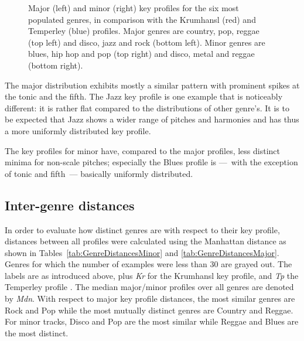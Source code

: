 \documentclass{article}
\begin{document}
\begin{figure}[tb]
	\caption{Major (left) and minor (right) key profiles for the six most populated genres, in comparison with the Krumhansl (red) and Temperley (blue) profiles. Major genres are country, pop, reggae (top left) and disco, jazz and rock (bottom left). Minor genres are blues, hip hop and pop (top right) and disco, metal and reggae (bottom right).}
	\label{fig:SpecificKeyProfiles}
\end{figure}
The major distribution exhibits mostly a similar pattern with prominent spikes at the tonic and the fifth. The Jazz key profile is one example that is noticeably different: it is rather flat compared to the distributions of other genre's. It is to be expected that Jazz shows a wider range of pitches and harmonies and has thus a more uniformly distributed key profile.

The key profiles for minor have, compared to the major profiles, less distinct minima for non-scale pitches; especially the Blues profile is ---~with the exception of tonic and fifth~--- basically uniformly distributed.

\subsection{Inter-genre distances}
In order to evaluate how distinct genres are with respect to their key profile, distances between all profiles were calculated using the Manhattan distance as shown in Tables~\ref{tab:GenreDistancesMinor} and \ref{tab:GenreDistancesMajor}. Genres for which the number of examples were less than 30 are grayed out. The labels are as introduced above, plus \textit{Kr} for the Krumhansl key profile,  and \textit{Tp} the Temperley profile \cite{temperley_tonal_2007}. The median major/minor profiles over all genres are denoted by \textit{Mdn}.
With respect to major key profile distances, the most similar genres are Rock and Pop while the most mutually distinct genres are Country and Reggae. For minor tracks, Disco and Pop are the most similar while Reggae and Blues are the most distinct.

\end{document}
